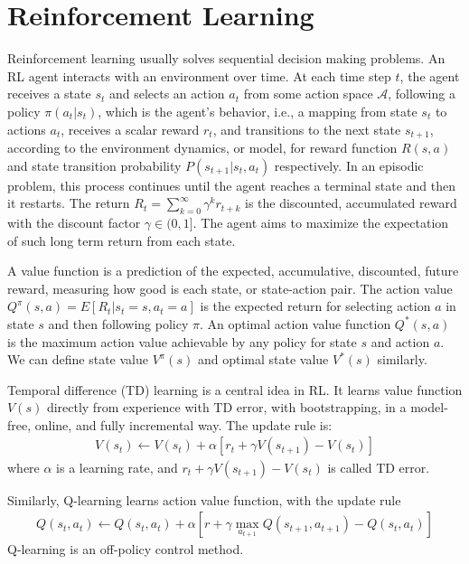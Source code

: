 \section{Reinforcement Learning}

Reinforcement learning usually solves sequential decision making problems. An RL agent interacts with an environment over time. At each time step $t$, the agent receives a state $s_t$ and selects an action $a_t$ from some action space $\mathcal{A}$, following a policy $\pi(a_t|s_t)$, which is the agent's behavior, i.e., a mapping from state $s_t$ to actions $a_t$, receives a scalar reward $r_t$, and transitions to the next state $s_{t+1}$, according to the environment dynamics, or model, for reward function $R(s,a)$ and state transition probability $P(s_{t+1}|s_t, a_t)$ respectively. In an episodic problem, this process continues until the agent reaches a terminal state and then it restarts. The return $R_t = \sum_{k=0}^{\infty} \gamma^k r_{t+k}$ is the discounted, accumulated reward with the discount factor $\gamma \in (0,1]$. The agent aims to maximize the expectation of such long term return from each state.     

A value function is a prediction of the expected, accumulative, discounted, future reward, measuring how good is each state, or state-action pair. The action value $Q^{\pi}(s, a) = E[R_t | s_t = s, a_t = a]$ is the expected return for selecting action $a$ in state $s$ and then following policy $\pi$. An optimal action value function $Q^{*}(s, a)$ is the maximum action value achievable by any policy for state $s$ and action $a$. We can define state value $V^{\pi}(s)$ and optimal state value $V^{*}(s)$ similarly.

Temporal difference (TD) learning is a central idea in RL. It learns value function $V(s)$ directly from experience with TD error, with bootstrapping, in a model-free, online, and fully incremental way. 
The update rule is:
\begin{align*}
 V(s_t) \leftarrow V(s_t) + \alpha [r_t + \gamma V(s_{t+1}) - V(s_t)]   
\end{align*}
where $\alpha$ is a learning rate, and $r_t + \gamma V(s_{t+1}) - V(s_t)$ is called TD error.

Similarly, Q-learning learns action value function, with the update rule
\begin{align*}
 Q(s_t, a_t) \leftarrow Q(s_t, a_t) + \alpha [r + \gamma \max_{a_{t+1}}Q(s_{t+1}, a_{t+1}) - Q(s_t,a_t)]   
\end{align*}
Q-learning is an off-policy control method.

